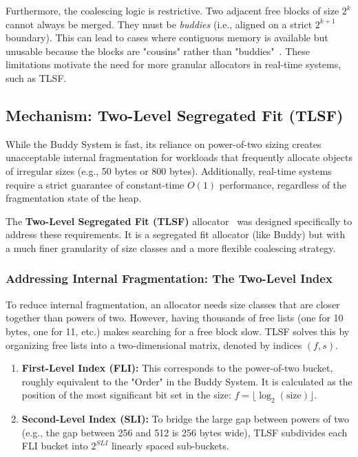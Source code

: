 \documentclass[a4paper,10pt,twoside]{report}
\theoremstyle{definition}
\begin{document}
Furthermore, the coalescing logic is restrictive. Two adjacent free blocks of size $2^k$ cannot always be merged. They must be \textit{buddies} (i.e., aligned on a strict $2^{k+1}$ boundary). This can lead to cases where contiguous memory is available but unusable because the blocks are "cousins" rather than "buddies"~\cite{wilson1995survey}. These limitations motivate the need for more granular allocators in real-time systems, such as TLSF.

\subsection{Mechanism: Two-Level Segregated Fit (TLSF)}

While the Buddy System is fast, its reliance on power-of-two sizing creates unacceptable internal fragmentation for workloads that frequently allocate objects of irregular sizes (e.g., 50 bytes or 800 bytes). Additionally, real-time systems require a strict guarantee of constant-time $O(1)$ performance, regardless of the fragmentation state of the heap.

The \textbf{Two-Level Segregated Fit (TLSF)} allocator~\cite{masmano2004tlsf} was designed specifically to address these requirements. It is a segregated fit allocator (like Buddy) but with a much finer granularity of size classes and a more flexible coalescing strategy.

\subsubsection{Addressing Internal Fragmentation: The Two-Level Index}
To reduce internal fragmentation, an allocator needs size classes that are closer together than powers of two. However, having thousands of free lists (one for 10 bytes, one for 11, etc.) makes searching for a free block slow. TLSF solves this by organizing free lists into a two-dimensional matrix, denoted by indices $(f, s)$.

\begin{enumerate}
    \item \textbf{First-Level Index (FLI):} This corresponds to the power-of-two bucket, roughly equivalent to the "Order" in the Buddy System. It is calculated as the position of the most significant bit set in the size: $f = \lfloor \log_2(\text{size}) \rfloor$.
    \item \textbf{Second-Level Index (SLI):} To bridge the large gap between powers of two (e.g., the gap between 256 and 512 is 256 bytes wide), TLSF subdivides each FLI bucket into $2^{SLI}$ linearly spaced sub-buckets.
\end{enumerate}
\end{document}
